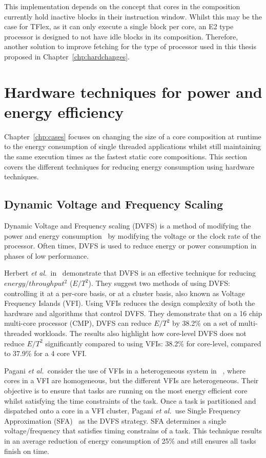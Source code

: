 This implementation depends on the concept that cores in the composition currently hold inactive blocks in their instruction window.
Whilst this may be the case for TFlex, as it can only execute a single block per core, an E2 type processor is designed to not have idle blocks in its composition.
Therefore, another solution to improve fetching for the type of processor used in this thesis proposed in Chapter~\ref{chp:hardchanges}.

\vspace{-1em}
\section{Hardware techniques for power and energy efficiency}

Chapter~\ref{chp:cases} focuses on changing the size of a core composition at runtime to the energy consumption of single threaded applications whilst still maintaining the same execution times as the fastest static core compositions.
This section covers the different techniques for reducing energy consumption using hardware techniques.

\subsection{Dynamic Voltage and Frequency Scaling}
Dynamic Voltage and Frequency scaling (DVFS) is a method of modifying the power and energy consumption~\cite{paganiEECHM2017} by modifying the voltage or the clock rate of the processor.
Often times, DVFS is used to reduce energy or power consumption in phases of low performance.

Herbert {\it et al.~}in~\cite{herbertDVFS07} demonstrate that DVFS is an effective technique for reducing $energy/throughput^2$ ($E/T^2$).
They suggest two methods of using DVFS: controlling it at a per-core basis, or at a cluster basis, also known as Voltage Frequency Islands (VFI).
Using VFIs reduces the design complexity of both the hardware and algorithms that control DVFS.
They demonstrate that on a 16 chip multi-core processor (CMP), DVFS can reduce $E/T^2$ by 38.2\% on a set of multi-threaded workloads.
The results also highlight how core-level DVFS does not reduce $E/T^2$ significantly compared to using VFIs: 38.2\% for core-level, compared to 37.9\% for a 4 core VFI.

Pagani {\it et al.~}consider the use of VFIs in a heterogeneous system in ~\cite{paganiEECHM2017}, where cores in a VFI are homogeneous, but the different VFIs are heterogeneous.
Their objective is to ensure that tasks are running on the most energy efficient core whilst satisfying the time constraints of the task.
Once a task is partitioned and dispatched onto a core in a VFI cluster, Pagani {\it et al.~}use Single Frequency Approximation (SFA)~\cite{sfaScheme} as the DVFS strategy.
SFA determines a single voltage/frequency that satisfies timing constrains of a task.
This technique results in an average reduction of energy consumption of 25\% and still ensures all tasks finish on time.


